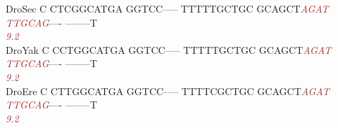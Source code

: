 \documentclass[11pt,twoside,reqno,a4paper]{article}
\begin{document}
{DroSec	C	CTCGGCATGA	GGTCC-----	TTTTTGCTGC	GCAGCT\textit{\textcolor{Brown}{A}}\textit{\textcolor{Brown}{G}}\textit{\textcolor{Brown}{A}}\textit{\textcolor{Brown}{T}}	\textit{\textcolor{Brown}{T}}\textit{\textcolor{Brown}{T}}\textit{\textcolor{Brown}{G}}\textit{\textcolor{Brown}{C}}\textit{\textcolor{Brown}{A}}\textit{\textcolor{Brown}{G}}----	--------T\\
\hspace*{7\charwidth}\hspace*{1\charwidth}\hspace*{1\charwidth}\hspace*{1\charwidth}\hspace*{1\charwidth}\hspace*{37\charwidth}\textit{\textcolor{Brown}{9.2}}\hspace*{1\charwidth}\hspace*{1\charwidth}\\
DroYak	C	CCTGGCATGA	GGTCC-----	TTTTTGCTGC	GCAGCT\textit{\textcolor{Brown}{A}}\textit{\textcolor{Brown}{G}}\textit{\textcolor{Brown}{A}}\textit{\textcolor{Brown}{T}}	\textit{\textcolor{Brown}{T}}\textit{\textcolor{Brown}{T}}\textit{\textcolor{Brown}{G}}\textit{\textcolor{Brown}{C}}\textit{\textcolor{Brown}{A}}\textit{\textcolor{Brown}{G}}----	--------T\\
\hspace*{7\charwidth}\hspace*{1\charwidth}\hspace*{1\charwidth}\hspace*{1\charwidth}\hspace*{1\charwidth}\hspace*{37\charwidth}\textit{\textcolor{Brown}{9.2}}\hspace*{1\charwidth}\hspace*{1\charwidth}\\
DroEre	C	CTTGGCATGA	GGTCC-----	TTTTCGCTGC	GCAGCT\textit{\textcolor{Brown}{A}}\textit{\textcolor{Brown}{G}}\textit{\textcolor{Brown}{A}}\textit{\textcolor{Brown}{T}}	\textit{\textcolor{Brown}{T}}\textit{\textcolor{Brown}{T}}\textit{\textcolor{Brown}{G}}\textit{\textcolor{Brown}{C}}\textit{\textcolor{Brown}{A}}\textit{\textcolor{Brown}{G}}----	--------T\\
\hspace*{7\charwidth}\hspace*{1\charwidth}\hspace*{1\charwidth}\hspace*{1\charwidth}\hspace*{1\charwidth}\hspace*{37\charwidth}\textit{\textcolor{Brown}{9.2}}\hspace*{1\charwidth}\hspace*{1\charwidth}\\
}
\end{document}
